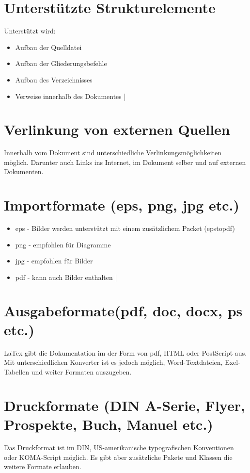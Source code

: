 \documentclass{article}
\begin{document}
\section{Unterstützte Strukturelemente}
Unterstützt wird:
\begin{itemize}
	\item Aufbau der Quelldatei
	\item Aufbau der Gliederungsbefehle
	\item Aufbau des Verzeichnisses
	\item Verweise innerhalb des Dokumentes
|\end{itemize}

\section{Verlinkung von externen Quellen}
Innerhalb vom Dokument sind unterschiedliche Verlinkungsmöglichkeiten möglich.
Darunter auch Links ins Internet, im Dokument selber und auf externen Dokumenten.

\section{Importformate (eps, png, jpg etc.)}
\begin{itemize}
	\item eps - Bilder werden unterstützt mit einem zusätzlichem Packet (epstopdf)
	\item png - empfohlen für Diagramme
	\item jpg - empfohlen für Bilder
	\item pdf - kann auch Bilder enthalten
|\end{itemize}

\section{Ausgabeformate(pdf, doc, docx, ps etc.)}
LaTex gibt die Dokumentation im der Form von pdf, HTML oder PostScript aus.
Mit unterschiedlichen Konverter ist es jedoch möglich, Word-Textdateien, Exel-Tabellen und weiter Formaten auszugeben.

\section{Druckformate (DIN A-Serie, Flyer, Prospekte, Buch, Manuel etc.)}
Das Druckformat ist im DIN, US-amerikanische typografischen Konventionen oder KOMA-Script möglich.
Es gibt aber zusätzliche Pakete und Klassen die weitere Formate erlauben.
\end{document}
